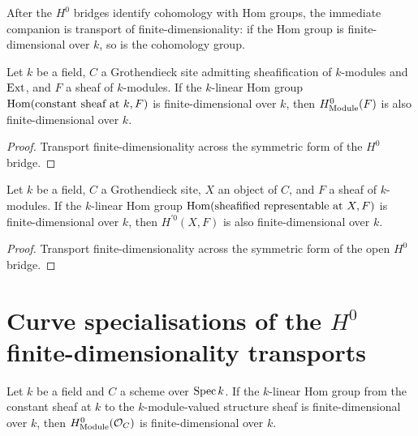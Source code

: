 After the \(H^0\) bridges identify cohomology with Hom groups, the immediate companion is transport of finite-dimensionality: if the Hom group is finite-dimensional over \(k\), so is the cohomology group.

\begin{theorem}\leanok
  \label{thm:Scheme_module_finite_HModule_zero}

  Let \(k\) be a field, \(C\) a Grothendieck site admitting sheafification of \(k\)-modules and \(\operatorname{Ext}\), and \(F\) a sheaf of \(k\)-modules. If the \(k\)-linear Hom group \(\operatorname{Hom}(\text{constant sheaf at }k, F)\) is finite-dimensional over \(k\), then \(H^0_{\mathrm{Module}}(F)\) is also finite-dimensional over \(k\).
\end{theorem}

\begin{proof}
  
  \leanok
  Transport finite-dimensionality across the symmetric form of the \(H^0\) bridge.
\end{proof}

\begin{theorem}\leanok
  \label{thm:Scheme_module_finite_HModule_prime_zero}
  Let \(k\) be a field, \(C\) a Grothendieck site, \(X\) an object of \(C\), and \(F\) a sheaf of \(k\)-modules. If the \(k\)-linear Hom group \(\operatorname{Hom}(\text{sheafified representable at }X, F)\) is finite-dimensional over \(k\), then \(H^{\prime 0}(X, F)\) is also finite-dimensional over \(k\).
\end{theorem}

\begin{proof}
  
  \leanok
  Transport finite-dimensionality across the symmetric form of the open \(H^0\) bridge.
\end{proof}

\section{Curve specialisations of the \(H^0\) finite-dimensionality transports}
\label{sec:HModule_finite_zero_curve_iter039}

\begin{theorem}\leanok
  \label{thm:Scheme_module_finite_HModule_zero_curve}
  Let \(k\) be a field and \(C\) a scheme over \(\operatorname{Spec} k\). If the \(k\)-linear Hom group from the constant sheaf at \(k\) to the \(k\)-module-valued structure sheaf is finite-dimensional over \(k\), then \(H^0_{\mathrm{Module}}(\mathcal O_C)\) is finite-dimensional over \(k\).
\end{theorem}

